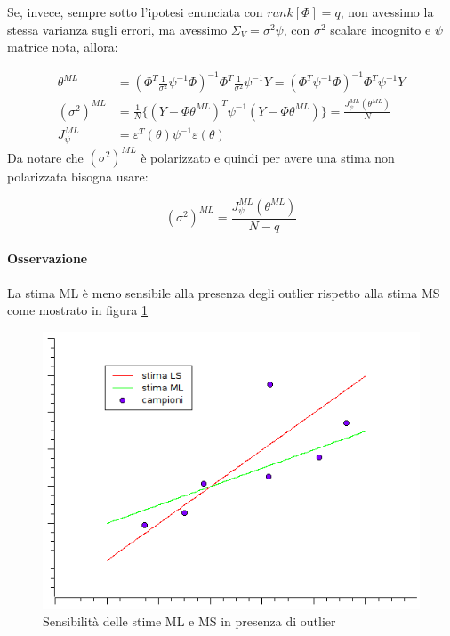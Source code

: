 Se, invece, sempre sotto l'ipotesi enunciata con $rank[\Phi]=q$, non avessimo la stessa varianza sugli errori, ma avessimo $\Sigma_V=\sigma^2\psi$, con $\sigma^2$ scalare incognito e $\psi$ matrice nota, allora:

  \begin{align*}
    \theta^{ML}&=(\Phi^T\frac{1}{\sigma^2}\psi^{-1}\Phi)^{-1}\Phi^T\frac{1}{\sigma^2}\psi^{-1}Y  =(\Phi^T\psi^{-1}\Phi)^{-1}\Phi^T\psi^{-1}Y  \\
    (\sigma^2)^{ML}&=\frac{1}{N}\{ (Y-\Phi\theta^{ML})^T\psi^{-1}(Y-\Phi\theta^{ML})\}=\frac{J_\psi^{ML}(\theta^{ML})}{N}\\
    J_\psi^{ML}&=\varepsilon ^T(\theta)\psi^{-1}\varepsilon (\theta)
  \end{align*} %
Da notare che $(\sigma^2)^{ML}$ è polarizzato e quindi per avere una stima non polarizzata bisogna usare:

  \[ (\sigma^2)^{ML}=\frac{J_\psi^{ML}(\theta^{ML})}{N-q} \]
  
\paragraph{Osservazione} La stima ML è meno sensibile alla presenza degli outlier rispetto alla stima MS come mostrato in figura \ref{fig:MLMSoutlier}

\begin{figure}[htbp]
  \centering
  \includegraphics[scale=0.5]{img/outlier.png}
  \caption{Sensibilità delle stime ML e MS in presenza di outlier\label{fig:MLMSoutlier}}
\end{figure}

